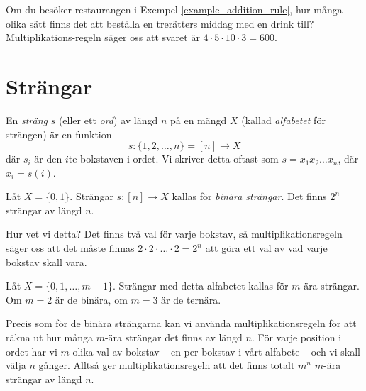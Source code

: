 \documentclass{tufte-handout}
\begin{document}
\begin{example}
	Om du besöker restaurangen i Exempel \ref{example_addition_rule}, hur många olika sätt finns det att beställa en trerätters middag med en drink till?
	 Multiplikations-regeln säger oss att svaret är $4\cdot 5\cdot 10\cdot 3 = 600$.
\end{example}

\section{Strängar}

\begin{definition}
	En \emph{sträng} $s$ (eller ett \emph{ord}) av längd $n$ på en mängd $X$ (kallad \emph{alfabetet} för strängen) är en funktion
	$$s: \{1, 2, \ldots, n\} = [n] \to X$$
	där $s_i$ är den $i$te bokstaven i ordet.
	Vi skriver detta oftast som $s = x_1x_2\ldots x_n$, där $x_i = s(i)$.
\end{definition}

\begin{example}
	Låt $X = \{0,1\}$. Strängar $s: [n] \to X$ kallas för \emph{binära strängar}. Det finns $2^n$ strängar av längd $n$.

	Hur vet vi detta? Det finns två val för varje bokstav, så multiplikationsregeln säger oss att det måste finnas $2\cdot 2\cdot\ldots\cdot 2 = 2^n$ att göra ett val av vad varje bokstav skall vara.
\end{example}

\begin{example}
	Låt $X = \{0,1,\ldots,m-1\}$. Strängar med detta alfabetet kallas för $m$-ära strängar. Om $m = 2$ är de binära, om $m = 3$ är de ternära.
	
	Precis som för de binära strängarna kan vi använda multiplikationsregeln för att räkna ut hur många $m$-ära strängar det finns av längd $n$. För varje position i ordet har vi $m$ olika val av bokstav -- en per bokstav i vårt alfabete -- och vi skall välja $n$ gånger. Alltså ger multiplikationsregeln att det finns totalt $m^n$ $m$-ära strängar av längd $n$. 
\end{example}
\end{document}
